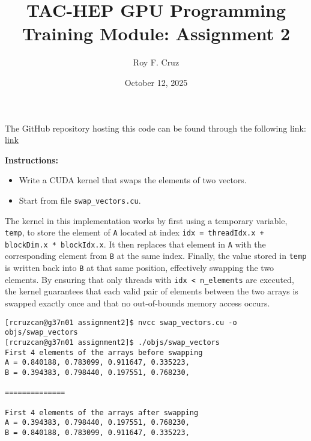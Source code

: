 \documentclass{article}
\title{
    TAC-HEP GPU Programming Training Module: Assignment 2
}
\author{Roy F. Cruz}
\newcounter{exercise}
\newenvironment{exr}[1]{%
    \refstepcounter{exercise}
    \begin{tcolorbox}[colback=blue!5!white, colframe=blue!75!black, title=Exercise \theexercise]
    \textbf{Instructions:} #1
    \end{tcolorbox}
    \vspace{1em}
}{}
\begin{document}
\date{October 12, 2025}
\maketitle

The GitHub repository hosting this code can be found through the following link: \href{https://github.com/roy-cruz/TAC-HEP_GPU-Course_Assignments/tree/master}{link}

\begin{exr}{
    \begin{itemize}
        \item Write a CUDA kernel that swaps the elements of two vectors.
        \item Start from file \texttt{swap\_vectors.cu}.
    \end{itemize}
    }
\end{exr}

The kernel in this implementation works by first using a temporary variable, \texttt{temp}, to store the element of \texttt{A} located at index \texttt{idx = threadIdx.x + blockDim.x * blockIdx.x}. It then replaces that element in \texttt{A} with the corresponding element from \texttt{B} at the same index. Finally, the value stored in \texttt{temp} is written back into \texttt{B} at that same position, effectively swapping the two elements. By ensuring that only threads with \texttt{idx < n\_elements} are executed, the kernel guarantees that each valid pair of elements between the two arrays is swapped exactly once and that no out-of-bounds memory access occurs.



\begin{lstlisting}[style=output]
[rcruzcan@g37n01 assignment2]$ nvcc swap_vectors.cu -o objs/swap_vectors
[rcruzcan@g37n01 assignment2]$ ./objs/swap_vectors 
First 4 elements of the arrays before swapping
A = 0.840188, 0.783099, 0.911647, 0.335223, 
B = 0.394383, 0.798440, 0.197551, 0.768230, 

==============

First 4 elements of the arrays after swapping
A = 0.394383, 0.798440, 0.197551, 0.768230, 
B = 0.840188, 0.783099, 0.911647, 0.335223, 
\end{lstlisting}


\end{document}
